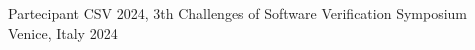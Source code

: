 
\begin{cvhonors}

  \cvhonor
	{Partecipant}
	{CSV 2024, 3th Challenges of Software Verification Symposium}
	{Venice, Italy} %
	{2024} %

\end{cvhonors}
